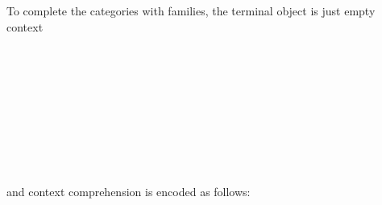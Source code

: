 To complete the categories with families, the terminal object is just empty context
\begin{code}
%
\\
\> \AgdaSymbol{:} \<%
\\
\> \<[4]%
\>[4]\AgdaSymbol{=}  \AgdaSymbol{\{}\<%
\\
\>[0]\<[6]%
\>[6] \AgdaSymbol{=} \AgdaSymbol{;}\<%
\\
\>[0]\<[6]%
\>[6] \<[14]%
\>[14]\AgdaSymbol{=}  \AgdaBound{\_} \AgdaBound{\_}  \AgdaSymbol{;}\<%
\\
\>[0]\<[6]%
\>[6] \<[14]%
\>[14]\AgdaSymbol{=} \AgdaSymbol{;}\<%
\\
\>[0]\<[6]%
\>[6] \<[14]%
\>[14]\AgdaSymbol{=}  \AgdaBound{\_}  \AgdaSymbol{;}\<%
\\
\>[0]\<[6]%
\>[6] \<[14]%
\>[14]\AgdaSymbol{=}  \AgdaBound{\_} \AgdaBound{\_}   \AgdaSymbol{\}}\<%
\\
\end{code}

and context comprehension is encoded as follows:

